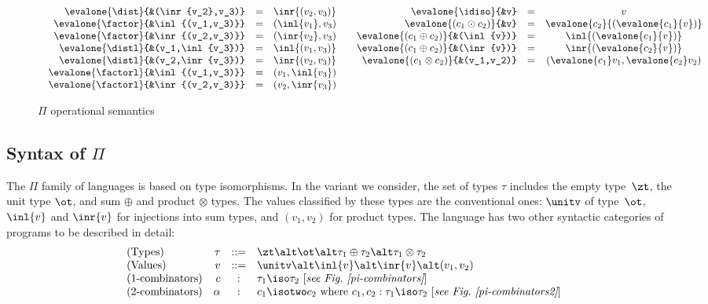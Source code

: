 \begin{figure}[ht]
{\[\begin{array}{cc}
\begin{array}[t]{rlcl}
\evalone{\dist}{&(\inr{v_2},v_3)} &=& \inr{(v_2,v_3)} \\
\evalone{\factor}{&\inl{(v_1,v_3)}} &=& (\inl{v_1},v_3) \\
\evalone{\factor}{&\inr{(v_2,v_3)}} &=& (\inr{v_2},v_3) \\
\evalone{\distl}{&(v_1,\inl{v_3})} &=& \inl{(v_1,v_3)} \\
\evalone{\distl}{&(v_2,\inr{v_3})} &=& \inr{(v_2,v_3)} \\
\evalone{\factorl}{&\inl{(v_1,v_3)}} &=& (v_1,\inl{v_3}) \\
\evalone{\factorl}{&\inr{(v_2,v_3)}} &=& (v_2,\inr{v_3})
\end{array} &
\begin{array}[t]{rlcl}
\evalone{\idiso}{&v} &=& v \\
\evalone{(c_1 \odot c_2)}{&v} &=&
  \evalone{c_2}{(\evalone{c_1}{v})} \\
\evalone{(c_1 \oplus c_2)}{&(\inl{v})} &=&
  \inl{(\evalone{c_1}{v})} \\
\evalone{(c_1 \oplus c_2)}{&(\inr{v})} &=&
  \inr{(\evalone{c_2}{v})} \\
\evalone{(c_1 \otimes c_2)}{&(v_1,v_2)} &=&
  (\evalone{c_1}v_1, \evalone{c_2}v_2)
\end{array}
\end{array}\]
\caption{\label{opsem}$\Pi$ operational semantics}
}
\end{figure}

\subsection{Syntax of $\Pi$}
\label{opsempi}

The $\Pi$ family of languages is based on type isomorphisms. In the
variant we consider, the set of types $\tau$ includes the empty
type~$\zt$, the unit type $\ot$, and sum $\oplus$ and product
$\otimes$ types. The values classified by these types are the
conventional ones: $\unitv$ of type~$\ot$, $\inl{v}$ and $\inr{v}$ for
injections into sum types, and $(v_1,v_2)$ for product types. The
language has two other syntactic categories of programs to be
described in detail:
\[\begin{array}{lrcl}
(\textrm{Types}) &
  \tau &::=& \zt \alt \ot \alt \tau_1 \oplus \tau_2 \alt \tau_1 \otimes \tau_2 \\
(\textrm{Values}) &
  v &::=& \unitv \alt \inl{v} \alt \inr{v} \alt (v_1,v_2) \\
(\textrm{1-combinators}) &
  c &:& \tau_1 \iso \tau_2 ~ [\textit{see Fig.~\ref{pi-combinators}}] \\
(\textrm{2-combinators}) &
  \alpha &:& c_1 \isotwo c_2 \mbox{~where~} c_1, c_2 : \tau_1 \iso \tau_2
  ~[\textit{see Fig.~\ref{pi-combinators2}}]
\end{array}\]

